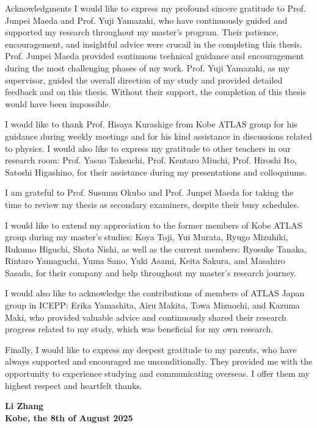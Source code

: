 \begin{abstractpage}{Acknowledgments}
I would like to express my profound sincere gratitude to Prof. Junpei Maeda and Prof. Yuji Yamazaki, who have continuously guided and supported my research throughout my master’s program. Their patience, encouragement, and insightful advice were crucail in the completing this thesis. Prof. Junpei Maeda provided continuous technical guidance and encouragement during the most challenging phases of my work. Prof. Yuji Yamazaki, as my supervisor, guided the overall direction of my study and provided detailed feedback and on this thesis. Without their support, the completion of this thesis would have been impossible.

I would like to thank Prof. Hisaya Kurashige from Kobe ATLAS group for his guidance during weekly meetings and for his kind assistance in discussions related to physics. I would also like to express my gratitude to other teachers in our research room: Prof. Yasuo Takeuchi, Prof. Kentaro Miuchi, Prof. Hiroshi Ito, Satoshi Higashino, for their assistance during my presentations and colloquiums.

I am grateful to Prof. Susumu Okubo and Prof. Junpei Maeda for taking the time to review my thesis as secondary examiners, despite their busy schedules.

I would like to extend my appreciation to the former members of Kobe ATLAS group during my master’s studies: Koya Toji, Yui Murata, Ryugo Mizuhiki, Rukumo Higuchi, Shota Nishi, as well as the current members: Ryosuke Tanaka, Rintaro Yamaguchi, Yuma Sano, Yuki Asami, Keita Sakura, and Masahiro Sasada, for their company and help throughout my master’s research journey.

I would also like to acknowledge the contributions of members of ATLAS Japan group in ICEPP: Erika Yamashita, Airu Makita, Towa Mizuochi, and Kazuma Maki, who provided valuable advice and continuously shared their research progress related to my study, which was beneficial for my own research.

Finally, I would like to express my deepest gratitude to my parents, who have always supported and encouraged me unconditionally. They provided me with the opportunity to experience studying and communicating overseas. I offer them my highest respect and heartfelt thanks.

\par\bigskip
\par\bigskip

\begin{flushright}
\par\bigskip
\textbf{Li Zhang}\\
\textbf{Kobe, the 8th of August 2025}
\end{flushright}
\end{abstractpage}
